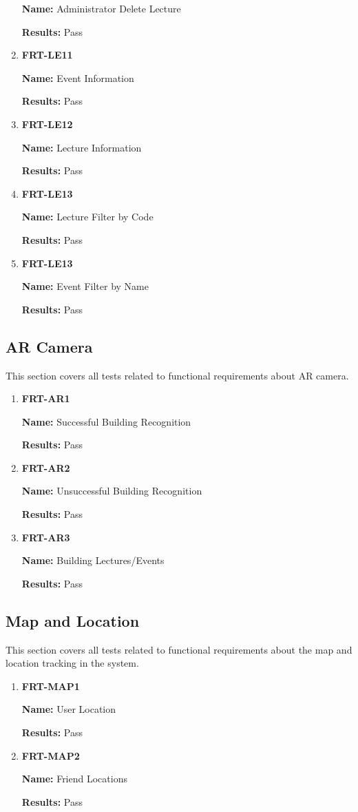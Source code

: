 \documentclass[12pt, titlepage]{article}
\begin{document}
\begin{enumerate}
\textbf{Name:} Administrator Delete Lecture

\textbf{Results:} Pass

\item \textbf{FRT-LE11}

\textbf{Name:} Event Information

\textbf{Results:} Pass

\item \textbf{FRT-LE12}

\textbf{Name:} Lecture Information

\textbf{Results:} Pass

\item \textbf{FRT-LE13}

\textbf{Name:} Lecture Filter by Code

\textbf{Results:} Pass

\item \textbf{FRT-LE13}

\textbf{Name:} Event Filter by Name

\textbf{Results:} Pass
\end{enumerate}
\subsection{AR Camera}
This section covers all tests related to functional requirements about AR camera.
\begin{enumerate}
\item \textbf{FRT-AR1}

\textbf{Name:} Successful Building Recognition

\textbf{Results:} Pass

\item \textbf{FRT-AR2}

\textbf{Name:} Unsuccessful Building Recognition

\textbf{Results:} Pass

\item \textbf{FRT-AR3}

\textbf{Name:} Building Lectures/Events

\textbf{Results:} Pass
\end{enumerate}
\subsection{Map and Location}
This section covers all tests related to functional requirements about the map and location tracking in the system.
\begin{enumerate}
\item \textbf{FRT-MAP1}

\textbf{Name:} User Location

\textbf{Results:} Pass

\item \textbf{FRT-MAP2}

\textbf{Name:} Friend Locations

\textbf{Results:} Pass
\end{enumerate}
\end{document}

